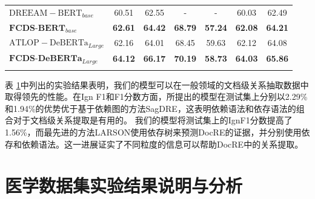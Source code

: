 \documentclass[bachelor]{thesis-uestc}
\begin{document}
\begin{table}
\begin{tabular}{@{}llllcccccc@{}}
    \multicolumn{4}{l}{$\mathrm{DREEAM-BERT}_{base}$\cite{ma-etal-2023-DREEAM}}                 & 60.51 & 62.55 & -        & -        & 60.03       & 62.49      \\
    \multicolumn{4}{l}{$\mathrm{\textbf{FCDS-BERT}}_{base}$}              & \textbf{62.61} & \textbf{64.42} & \textbf{68.79}    & \textbf{57.24}    & \textbf{62.08}       & \textbf{64.21}      \\ \midrule
    \multicolumn{4}{l}{$\mathrm{ATLOP-DeBERTa}_{Large}$\cite{zhou2021document}}          & 62.16 & 64.01 & 68.45        & 59.63        & 62.12       & 64.08      \\
    \multicolumn{4}{l}{$\mathrm{\textbf{FCDS-DeBERTa}}_{Large}$}           & \textbf{64.12} & \textbf{66.17} & \textbf{70.19}        & \textbf{58.73}        & \textbf{64.03}       & \textbf{65.86}    \\ \midrule \\
    \end{tabular}
    \label{results in docred}
\end{table}

表 \ref{results in docred}中列出的实验结果表明，我们的模型可以在一般领域的文档级关系抽取数据中取得领先的性能。在Ign F1和F1分数方面，所提出的模型在测试集上分别以2.29\%和1.94\%的优势优于基于依赖图的方法SagDRE\cite{SagDRE}，这表明依赖语法和依存语法的组合对于文档级关系提取是有用的。
我们的模型将测试集上的IgnF1分数提高了1.56\%，而最先进的方法LARSON\cite{duan-etal-2022-just}使用依存树来预测DocRE的证据，并分别使用依存和依赖语法。这一进展证实了不同粒度的信息可以帮助DocRE中的关系提取。\par

\section{医学数据集实验结果说明与分析}\label{sec:medical}
\end{document}
